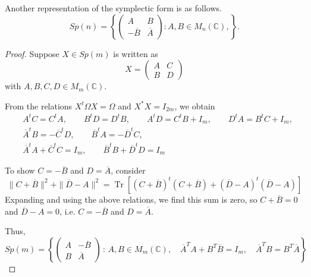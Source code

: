 \documentclass[../main.tex]{subfiles}
\begin{document}
Another representation of the symplectic form is as follows.
\begin{equation}
	Sp(n) = \left\{
	\begin{pmatrix}
		A             & B            \\
		-\overline{B} & \overline{A}
	\end{pmatrix} : A,B \in M_n(\mathbb{C}),
	\right\}.
\end{equation}
\begin{proof}
	Suppose $X \in Sp(m)$ is written as
	\begin{equation*}
		X = \begin{pmatrix}
			A & C \\
			B & D
		\end{pmatrix}
	\end{equation*}
	with $A, B, C, D \in M_m(\mathbb{C})$.

	From the relations $X^t \Omega X = \Omega$ and $X^* X = I_{2m}$, we obtain
	\begin{equation*}
		\begin{aligned}
			 & A^t C = C^t A, \qquad B^t D = D^t B, \qquad A^t D = C^t B + I_m, \qquad D^t A = B^t C + I_m, \\
			 & \overline{A}^t B = -\overline{C}^t D, \qquad \overline{B}^t A = -\overline{D}^t C,           \\
			 & \overline{A}^t A + \overline{C}^t C = I_m, \qquad \overline{B}^t B + \overline{D}^t D = I_m
		\end{aligned}
	\end{equation*}

	To show $C = -\overline{B}$ and $D = \overline{A}$, consider
	\begin{equation*}
		\| C + \overline{B} \|^2 + \| \overline{D} - A \|^2 = \operatorname{Tr}\left[(C + \overline{B})^t (C + \overline{B}) + (\overline{D} - A)^t (\overline{D} - A)\right]
	\end{equation*}
	Expanding and using the above relations, we find this sum is zero, so $C + \overline{B} = 0$ and $\overline{D} - A = 0$, i.e. $C = -\overline{B}$ and $D = \overline{A}$.

	Thus,
	\begin{equation*}
		Sp(m) = \left\{
		\begin{pmatrix}
			A & -\overline{B} \\
			B & \overline{A}
		\end{pmatrix}
		\,:\,
		A, B \in M_m(\mathbb{C}),
		\quad
		\overline{A}^T A + B^T \overline{B} = I_m,
		\quad
		\overline{A}^T B = B^T \overline{A}
		\right\}
	\end{equation*}
\end{proof}
\end{document}
